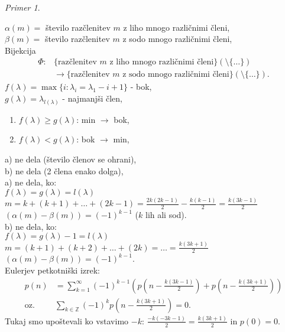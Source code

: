 \documentclass[a4paper, 12pt]{book}
\theoremstyle{definition}
\theoremstyle{remark}
\newtheorem*{ex}{Primer}
\newcommand{\Z}{\mathbb{Z}}
\begin{document}
\begin{ex}
\begin{enumerate}[label=(\arabic{*})]
      $\alpha(m) = $ število razčlenitev $m$ z liho mnogo različnimi členi, \\
      $\beta(m) = $ število razčlenitev $m$ z sodo mnogo različnimi členi, \\
      Bijekcija
      \begin{align*}
        \Phi: & \{\text{razčlenitev }m \text{ z liho mnogo različnimi členi}\} (\setminus \{\dots\}) \\
        &\to \{\text{razčlenitev }m \text{ z sodo mnogo različnimi členi}\} (\setminus \{\dots\}).
      \end{align*}
      $f(\lambda) = \max \{i: \lambda_i = \lambda_1 - i + 1\}$ - bok, \\
      $g(\lambda) = \lambda_{l(\lambda)}$ - najmanjši člen,
      \begin{enumerate}[label={\alph*)}]
        \item $f(\lambda) \geq g(\lambda)$: min $\to$ bok,
        \item $f(\lambda) < g(\lambda)$: bok $\to$ min,
      \end{enumerate}
      a) ne dela (število členov se ohrani), \\ %
      b) ne dela (2 člena enako dolga), \\ %
      a) ne dela, ko: \\ %
      $f(\lambda) = g(\lambda) = l(\lambda)$ \\
      $m = k + (k+1) + \dots + (2k-1) = \frac{2k(2k-1)}{2} - \frac{k(k-1)}{2} = \frac{k(3k-1)}{2}$ \\
      $(\alpha(m) - \beta(m)) = (-1)^{k-1}$ ($k$ lih ali sod). \\
      b) ne dela, ko: \\ %
      $f(\lambda) = g(\lambda) - 1 = l(\lambda)$ \\
      $m = (k+1) + (k+2) + \dots + (2k) = \dots = \frac{k(3k+1)}{2}$ \\
      $(\alpha(m) - \beta(m)) = (-1)^{k-1}$. \\
      Eulerjev petkotniški izrek:
      \begin{align*}
        p(n) &= \sum_{k=1}^{\infty} (-1)^{k-1} \left(p\left(n-\frac{k(3k-1)}{2}\right) + p\left(n-\frac{k(3k+1)}{2}\right)\right) \\
        \text{oz.} & \sum_{k \in \Z} (-1)^k p\left(n - \frac{k(3k+1)}{2}\right) = 0.
      \end{align*}
      Tukaj smo upoštevali ko vstavimo $-k$: $\frac{-k(-3k-1)}{2} = \frac{k(3k+1)}{2}$ in $p(0) = 0$.
  \end{enumerate}
\end{ex}
\end{document}
